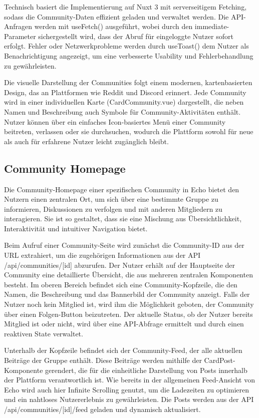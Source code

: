 \documentclass[a4paper,12pt]{article}
\begin{document}
Technisch basiert die Implementierung auf Nuxt 3 mit serverseitigem Fetching,
sodass die Community-Daten effizient geladen und verwaltet werden. Die
API-Anfragen werden mit useFetch() ausgeführt, wobei durch den
immediate-Parameter sichergestellt wird, dass der Abruf für eingeloggte Nutzer
sofort erfolgt. Fehler oder Netzwerkprobleme werden durch useToast() dem Nutzer
als Benachrichtigung angezeigt, um eine verbesserte Usability und
Fehlerbehandlung zu gewährleisten.

Die visuelle Darstellung der Communities folgt einem modernen, kartenbasierten
Design, das an Plattformen wie Reddit und Discord erinnert. Jede Community wird
in einer individuellen Karte (CardCommunity.vue) dargestellt, die neben Namen
und Beschreibung auch Symbole für Community-Aktivitäten enthält. Nutzer können
über ein einfaches Icon-basiertes Menü einer Community beitreten, verlassen
oder sie durchsuchen, wodurch die Plattform sowohl für neue als auch für
erfahrene Nutzer leicht zugänglich bleibt.

\subsection{Community Homepage}
Die Community-Homepage einer spezifischen Community in Echo bietet den Nutzern
einen zentralen Ort, um sich über eine bestimmte Gruppe zu informieren,
Diskussionen zu verfolgen und mit anderen Mitgliedern zu interagieren. Sie ist
so gestaltet, dass sie eine Mischung aus Übersichtlichkeit, Interaktivität und
intuitiver Navigation bietet.

Beim Aufruf einer Community-Seite wird zunächst die Community-ID aus der URL
extrahiert, um die zugehörigen Informationen aus der API /api/communities/[id]
abzurufen. Der Nutzer erhält auf der Hauptseite der Community eine detaillierte
Übersicht, die aus mehreren zentralen Komponenten besteht. Im oberen Bereich
befindet sich eine Community-Kopfzeile, die den Namen, die Beschreibung und das
Bannerbild der Community anzeigt. Falls der Nutzer noch kein Mitglied ist, wird
ihm die Möglichkeit geboten, der Community über einen Folgen-Button
beizutreten. Der aktuelle Status, ob der Nutzer bereits Mitglied ist oder
nicht, wird über eine API-Abfrage ermittelt und durch einen reaktiven State
verwaltet.

Unterhalb der Kopfzeile befindet sich der Community-Feed, der alle aktuellen
Beiträge der Gruppe enthält. Diese Beiträge werden mithilfe der
CardPost-Komponente gerendert, die für die einheitliche Darstellung von Posts
innerhalb der Plattform verantwortlich ist. Wie bereits in der allgemeinen
Feed-Ansicht von Echo wird auch hier Infinite Scrolling genutzt, um die
Ladezeiten zu optimieren und ein nahtloses Nutzererlebnis zu gewährleisten. Die
Posts werden aus der API /api/communities/[id]/feed geladen und dynamisch
aktualisiert.
\end{document}
